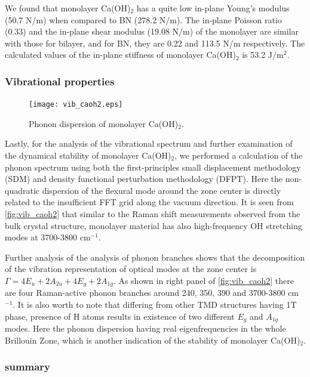 We found that monolayer Ca(OH)$_2$ has a quite low in-plane Young's modulus 
(50.7 N/m) when compared to BN (278.2 N/m). The in-plane Poisson ratio (0.33) 
and the in-plane shear modulus (19.08 N/m) of the monolayer are similar with 
those for bilayer, and for BN, they are 0.22 and 113.5 N/m respectively. The 
calculated values of the in-plane stiffness of monolayer Ca(OH)$_{2}$ is 53.2 
J$/$m$^{2}$. 

\subsubsection{Vibrational properties}\label{stability}
\begin{figure}[htbp]
\centering
\texttt{[image: vib\_caoh2.eps]}
\caption{\label{fig:vib_caoh2} Phonon dispersion of monolayer Ca(OH)$_2$.}
\end{figure}

Lastly, for the analysis of the vibrational spectrum and further examination of 
the dynamical stability of monolayer Ca(OH)$_2$, we performed a 
calculation of the phonon spectrum using both the first-principles small 
displacement methodology (SDM)\cite{alfe} and density functional perturbation 
methodology (DFPT)\cite{baroni}. Here the non-quadratic dispersion of the 
flexural mode around the zone center is directly related to the insufficient 
FFT grid along the vacuum direction. It is seen from \autoref{fig:vib_caoh2} that 
similar to the Raman shift measurements observed from the bulk crystal 
structure, monolayer material has also high-frequency OH stretching 
modes at 3700-3800 cm$^{-1}$. 

Further analysis of the analysis of phonon 
branches shows that the decomposition of the vibration representation of optical 
modes at the zone center is $\Gamma = 4E_{u} + 2A_{2u} + 4E_{g} + 2A_{1g}$. As 
shown in right panel of \autoref{fig:vib_caoh2} there are four Raman-active phonon 
branches around 240, 350, 390 and 3700-3800 cm$^{-1}$. It is also worth to note 
that differing from other TMD structures having 1T phase, presence of H atoms 
results in existence of two different $E_{g}$ and $A_{1g}$ modes. Here the 
phonon dispersion having real eigenfrequencies in the whole Brillouin Zone, 
which is another indication of the stability of monolayer Ca(OH)$_2$.

\subsubsection{summary }\label{disc}

